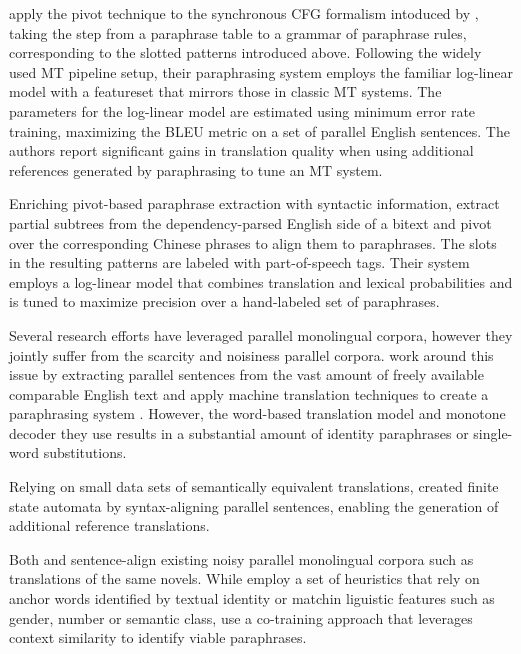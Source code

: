 \documentclass[11pt]{article}
\newcommand{\mnote}[1]{\marginpar{%
  \vskip-\baselineskip
  \raggedright\footnotesize
  \itshape\hrule\smallskip\tiny{#1}\par\smallskip\hrule}}
\begin{document}
 apply the pivot technique to the synchronous CFG
formalism intoduced by , taking the step from a
paraphrase table to a grammar of paraphrase rules, corresponding to
the slotted patterns introduced above. Following the widely used MT
pipeline setup, their paraphrasing system employs the familiar
log-linear model with a featureset that mirrors those in classic MT
systems. The parameters for the log-linear model are estimated using
minimum error rate training, maximizing the BLEU metric on a set of
parallel English sentences. The authors report significant gains in
translation quality when using additional references generated by
paraphrasing to tune an MT system.

Enriching pivot-based paraphrase extraction with syntactic
information,  extract partial subtrees from the
dependency-parsed English side of a bitext and pivot over the
corresponding Chinese phrases to align them to paraphrases. The slots
in the resulting patterns are labeled with part-of-speech tags. Their
system employs a log-linear model that combines translation and
lexical probabilities and is tuned to maximize precision over a
hand-labeled set of paraphrases.

Several research efforts have leveraged parallel monolingual corpora,
however they jointly suffer from the scarcity and noisiness parallel
corpora.  \mnote{Cite \cite{Dolan2005}, too.} work
around this issue by extracting parallel sentences from the vast
amount of freely available comparable English text and apply machine
translation techniques to create a paraphrasing system
\cite{Quirk2004}. However, the word-based translation model and
monotone decoder they use results in a substantial amount of identity
paraphrases or single-word substitutions.

Relying on small data sets of semantically equivalent translations,
 created finite state automata by syntax-aligning
parallel sentences, enabling the generation of additional reference
translations.

Both  and  sentence-align
existing noisy parallel monolingual corpora such as translations of
the same novels. While  employ a set of
heuristics that rely on anchor words identified by textual identity or
matchin liguistic features such as gender, number or semantic class,
 use a co-training approach that leverages
context similarity to identify viable paraphrases.
\end{document}
